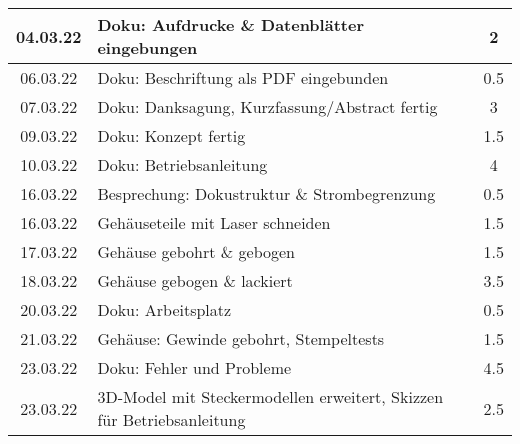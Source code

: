 \begin{longtable}{c|p{10cm}|c}
    04.03.22       & Doku: Aufdrucke \& Datenblätter eingebungen                                                                   & 2                \\ \hline
    06.03.22       & Doku: Beschriftung als PDF eingebunden                                                                        & 0.5              \\ \hline
    07.03.22       & Doku: Danksagung, Kurzfassung/Abstract fertig                                                                 & 3                \\ \hline
    09.03.22       & Doku: Konzept fertig                                                                                          & 1.5              \\ \hline
    10.03.22       & Doku: Betriebsanleitung                                                                                       & 4                \\ \hline
    16.03.22       & Besprechung: Dokustruktur \& Strombegrenzung                                                                  & 0.5              \\ \hline
    16.03.22       & Gehäuseteile mit Laser schneiden                                                                              & 1.5              \\ \hline
    17.03.22       & Gehäuse gebohrt \& gebogen                                                                                    & 1.5              \\ \hline
    18.03.22       & Gehäuse gebogen \& lackiert                                                                                   & 3.5              \\ \hline
    20.03.22       & Doku: Arbeitsplatz                                                                                            & 0.5              \\ \hline
    21.03.22       & Gehäuse: Gewinde gebohrt, Stempeltests                                                                        & 1.5              \\ \hline
    23.03.22       & Doku: Fehler und Probleme                                                                                     & 4.5              \\ \hline
    23.03.22       & 3D-Model mit Steckermodellen erweitert, \newline Skizzen für   Betriebsanleitung                              & 2.5              \\ \hline

\end{longtable}
